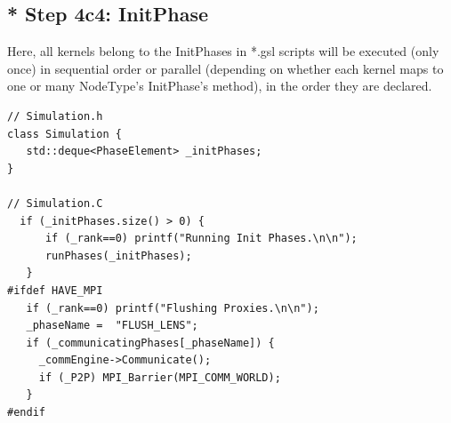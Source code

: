 \subsection{* Step 4c4: InitPhase}
\label{sec:GSL-simulations-part-InitPhase}
\label{sec:InitPhase}


Here, all kernels belong to the InitPhases in *.gsl scripts will be executed
(only once) in sequential order or parallel (depending on whether each kernel
maps to one or many NodeType's InitPhase's method), in the order they are
declared.

\begin{lstlisting}
// Simulation.h
class Simulation {
   std::deque<PhaseElement> _initPhases;
}

// Simulation.C
  if (_initPhases.size() > 0) {                                                                              
      if (_rank==0) printf("Running Init Phases.\n\n");                                                       
      runPhases(_initPhases);                                                                                 
   }                     
#ifdef HAVE_MPI                                                                                               
   if (_rank==0) printf("Flushing Proxies.\n\n");                                                             
   _phaseName =  "FLUSH_LENS";                                                                                
   if (_communicatingPhases[_phaseName]) {                                                                    
     _commEngine->Communicate();                                                                              
     if (_P2P) MPI_Barrier(MPI_COMM_WORLD);                                                                   
   }                                                                                                          
#endif                                                                                             
\end{lstlisting}

